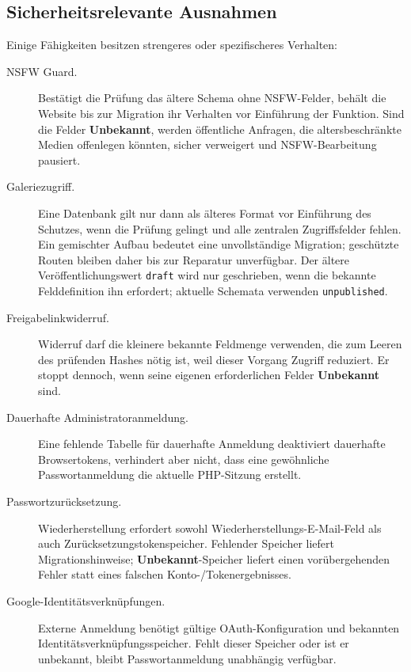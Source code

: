 \documentclass[11pt,a4paper]{article}
\newcommand{\ui}[1]{\textbf{#1}}
\newcommand{\codeword}[1]{\nolinkurl{#1}}
\begin{document}
\subsection{Sicherheitsrelevante Ausnahmen}

Einige Fähigkeiten besitzen strengeres oder spezifischeres Verhalten:

\begin{description}
  \item[NSFW Guard.] Bestätigt die Prüfung das ältere Schema ohne NSFW-Felder,
  behält die Website bis zur Migration ihr Verhalten vor Einführung der
  Funktion. Sind die Felder \ui{Unbekannt}, werden öffentliche Anfragen, die
  altersbeschränkte Medien offenlegen könnten, sicher verweigert und
  NSFW-Bearbeitung pausiert.
  \item[Galeriezugriff.] Eine Datenbank gilt nur dann als älteres Format vor
  Einführung des Schutzes, wenn die Prüfung gelingt und alle zentralen
  Zugriffsfelder fehlen. Ein gemischter Aufbau bedeutet eine unvollständige
  Migration; geschützte Routen bleiben daher bis zur Reparatur unverfügbar. Der
  ältere Veröffentlichungswert \codeword{draft} wird nur geschrieben, wenn die
  bekannte Felddefinition ihn erfordert; aktuelle Schemata verwenden
  \codeword{unpublished}.
  \item[Freigabelinkwiderruf.] Widerruf darf die kleinere bekannte Feldmenge
  verwenden, die zum Leeren des prüfenden Hashes nötig ist, weil dieser Vorgang
  Zugriff reduziert. Er stoppt dennoch, wenn seine eigenen erforderlichen Felder
  \ui{Unbekannt} sind.
  \item[Dauerhafte Administratoranmeldung.] Eine fehlende Tabelle für dauerhafte
  Anmeldung deaktiviert dauerhafte Browsertokens, verhindert aber nicht, dass
  eine gewöhnliche Passwortanmeldung die aktuelle PHP-Sitzung erstellt.
  \item[Passwortzurücksetzung.] Wiederherstellung erfordert sowohl
  Wieder\-her\-stel\-lungs-E-Mail-Feld als auch Zurücksetzungstokenspeicher.
  Fehlender Speicher liefert Migrationshinweise; \ui{Unbekannt}-Speicher liefert
  einen vorübergehenden Fehler statt eines falschen Konto-/Tokenergebnisses.
  \item[Google-Identitätsverknüpfungen.] Externe Anmeldung benötigt gültige
  OAuth-Konfiguration und bekannten Identitätsverknüpfungsspeicher. Fehlt dieser
  Speicher oder ist er unbekannt, bleibt Passwortanmeldung unabhängig verfügbar.
\end{description}
\end{document}
